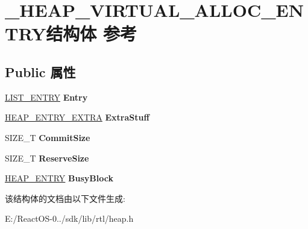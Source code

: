 \hypertarget{struct___h_e_a_p___v_i_r_t_u_a_l___a_l_l_o_c___e_n_t_r_y}{}\section{\+\_\+\+H\+E\+A\+P\+\_\+\+V\+I\+R\+T\+U\+A\+L\+\_\+\+A\+L\+L\+O\+C\+\_\+\+E\+N\+T\+R\+Y结构体 参考}
\label{struct___h_e_a_p___v_i_r_t_u_a_l___a_l_l_o_c___e_n_t_r_y}
\subsection*{Public 属性}
\begin{DoxyCompactItemize}
\item 
\mbox{\label{struct___h_e_a_p___v_i_r_t_u_a_l___a_l_l_o_c___e_n_t_r_y_a1303654f31dd8b5ebd2aa734de06d103}} 
\hyperlink{struct___l_i_s_t___e_n_t_r_y}{L\+I\+S\+T\+\_\+\+E\+N\+T\+RY} {\bfseries Entry}
\item 
\mbox{\label{struct___h_e_a_p___v_i_r_t_u_a_l___a_l_l_o_c___e_n_t_r_y_a7ae32f88a5a45efc29db4b3d30048318}} 
\hyperlink{struct___h_e_a_p___e_n_t_r_y___e_x_t_r_a}{H\+E\+A\+P\+\_\+\+E\+N\+T\+R\+Y\+\_\+\+E\+X\+T\+RA} {\bfseries Extra\+Stuff}
\item 
\mbox{\label{struct___h_e_a_p___v_i_r_t_u_a_l___a_l_l_o_c___e_n_t_r_y_a66e056018da7d58bc37445a50b635612}} 
S\+I\+Z\+E\+\_\+T {\bfseries Commit\+Size}
\item 
\mbox{\label{struct___h_e_a_p___v_i_r_t_u_a_l___a_l_l_o_c___e_n_t_r_y_a3773a3f470d6da8ddd1f5478226b5af2}} 
S\+I\+Z\+E\+\_\+T {\bfseries Reserve\+Size}
\item 
\mbox{\label{struct___h_e_a_p___v_i_r_t_u_a_l___a_l_l_o_c___e_n_t_r_y_a249641095752bca44f055ba20caf229e}} 
\hyperlink{struct___h_e_a_p___e_n_t_r_y}{H\+E\+A\+P\+\_\+\+E\+N\+T\+RY} {\bfseries Busy\+Block}
\end{DoxyCompactItemize}


该结构体的文档由以下文件生成\+:\begin{DoxyCompactItemize}
\item 
E\+:/\+React\+O\+S-\/0../sdk/lib/rtl/heap.\+h\end{DoxyCompactItemize}
